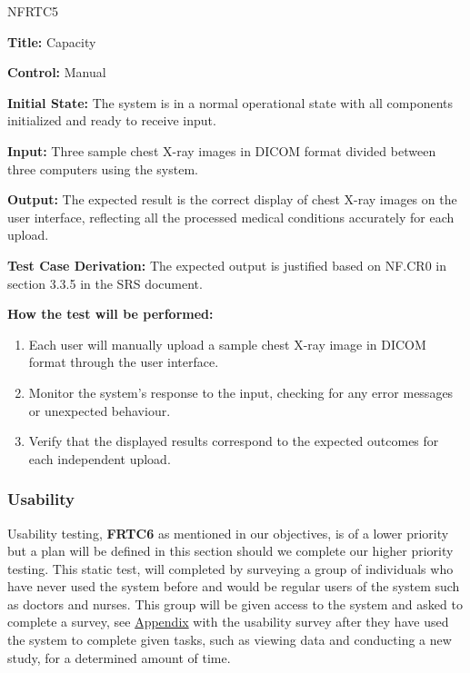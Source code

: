 \documentclass[12pt, titlepage]{article}
\begin{document}
\begin{itemize}
    \begin{item}
        NFRTC5
        \begin{mdframed}[linewidth=0.5mm]
            \textbf{Title:} Capacity \par
            \textbf{Control:} Manual \par
            \textbf{Initial State:} The system is in a normal operational state with all components initialized and ready to receive input. \par
            \textbf{Input:} Three sample chest X-ray images in DICOM format divided between three computers using the system. \par
            \textbf{Output:} The expected result is the correct display of chest X-ray images on the user interface, reflecting all the processed medical conditions accurately for each upload.  \par
            \textbf{Test Case Derivation:} The expected output is justified based on NF.CR0 in section 3.3.5 in the SRS document. \par
            \textbf{How the test will be performed:}
            \begin{enumerate}[noitemsep]
                \item Each user will manually upload a sample chest X-ray image in DICOM format through the user interface.
                \item Monitor the system's response to the input, checking for any error messages or unexpected behaviour.
                \item Verify that the displayed results correspond to the expected outcomes for each independent upload.
            \end{enumerate}
        \end{mdframed}
    \end{item}
\end{itemize}

\subsubsection{Usability} \hypertarget{Usability}{}
\noindent Usability testing, \textbf{FRTC6} as mentioned in our objectives, is of a lower priority but a plan will be defined in this section should we complete our higher priority testing. This static test, will completed by surveying a group of individuals who have never used the system before and would be regular users of the system such as doctors and nurses. This group will be given access to the system and asked to complete a survey, see \hyperlink{UsabilityS}{Appendix} with the usability survey after they have used the system to complete given tasks, such as viewing data and conducting a new study, for a determined amount of time.
\end{document}
